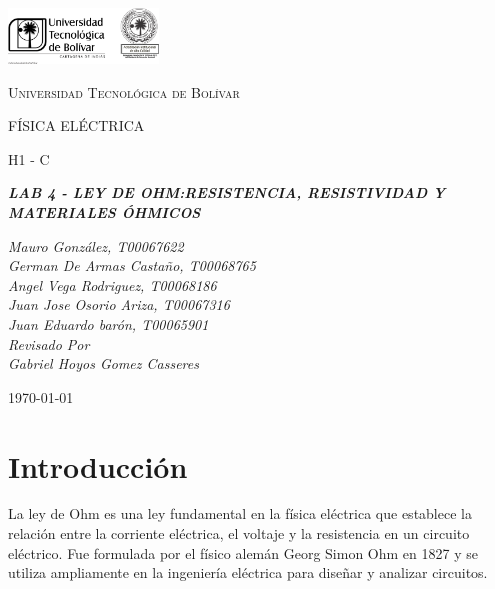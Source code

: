 \documentclass[letterpaper, 12pt]{report}
\begin{document}
\begin{titlepage}
	\centering
	\includegraphics[width=0.3\textwidth]{Images/logo_utb.png}\par\vspace{1cm}
	{\scshape\LARGE Universidad Tecnológica de Bolívar \par}
	\vspace{1cm}

	{\scshape\Large FÍSICA ELÉCTRICA \par}
	\vspace{.2cm}

	{\scshape\Large H1 - C \par}
	\vspace{1cm}
	\slshape {\Large \bfseries{} LAB 4 - LEY DE OHM:\@ RESISTENCIA, RESISTIVIDAD Y MATERIALES
	ÓHMICOS  \\}
	\vspace{1cm}

	\slshape {\itshape{} Mauro González, T00067622 \\}
	\slshape {\itshape{} German De Armas Castaño, T00068765 \\}
	\slshape {\itshape{} Angel Vega Rodriguez, T00068186 \\}
	\slshape {\itshape{} Juan Jose Osorio Ariza, T00067316 \\}
	\slshape {\itshape{} Juan Eduardo barón, T00065901 \\}
	\vfill
	Revisado Por \\
	Gabriel Hoyos Gomez Casseres\\
	{\large \today\par}
\end{titlepage}

\section{Introducción}

La ley de Ohm es una ley fundamental en la física eléctrica que establece la
relación entre la corriente eléctrica, el voltaje y la resistencia en un
circuito eléctrico. Fue formulada por el físico alemán Georg Simon Ohm en
1827 y se utiliza ampliamente en la ingeniería eléctrica para diseñar y
analizar circuitos.
\end{document}
